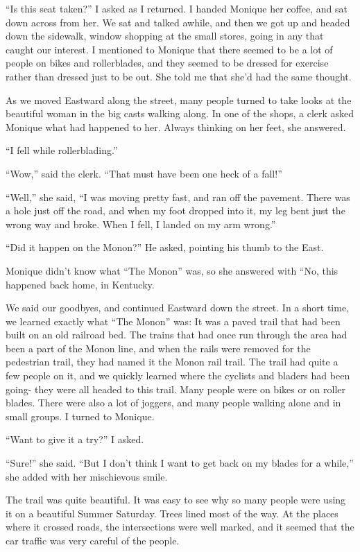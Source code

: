 ``Is this seat taken?'' I asked as I returned. I handed Monique her coffee, and sat down
across from her. We sat and talked awhile, and then we got up and headed down the sidewalk,
window shopping at the small stores, going in any that caught our interest. I mentioned to
Monique that there seemed to be a lot of people on bikes and rollerblades, and they seemed to be
dressed for exercise rather than dressed just to be out. She told me that she'd had the same
thought.

As we moved Eastward along the street, many people turned to take looks at the beautiful
woman in the big casts walking along. In one of the shops, a clerk asked Monique what had
happened to her. Always thinking on her feet, she answered.

``I fell while rollerblading.''

``Wow,'' said the clerk. ``That must have been one heck of a fall!''

``Well,'' she said, ``I was moving pretty fast, and ran off the pavement. There was a hole
just off the road, and when my foot dropped into it, my leg bent just the wrong way and broke.
When I fell, I landed on my arm wrong.''

``Did it happen on the Monon?'' He asked, pointing his thumb to the East.

Monique didn't know what ``The Monon'' was, so she answered with ``No, this happened back
home, in Kentucky.

We said our goodbyes, and continued Eastward down the street. In a short time, we learned
exactly what ``The Monon'' was: It was a paved trail that had been built on an old railroad bed.
The trains that had once run through the area had been a part of the Monon line, and when the
rails were removed for the pedestrian trail, they had named it the Monon rail trail. The trail
had quite a few people on it, and we quickly learned where the cyclists and bladers had been
going- they were all headed to this trail. Many people were on bikes or on roller blades. There
were also a lot of joggers, and many people walking alone and in small groups. I turned to
Monique.

``Want to give it a try?'' I asked.

``Sure!'' she said. ``But I don't think I want to get back on my blades for a while,'' she
added with her mischievous smile.

The trail was quite beautiful. It was easy to see why so many people were using it on a
beautiful Summer Saturday. Trees lined most of the way. At the places where it crossed roads,
the intersections were well marked, and it seemed that the car traffic was very careful of the
people.

